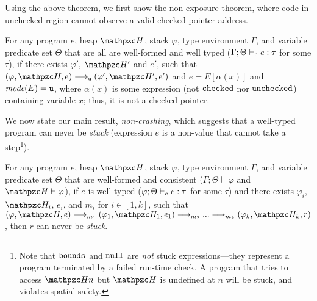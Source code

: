 Using the above theorem, we first show the non-exposure theorem,
where code in unchecked region cannot observe a valid checked pointer address.

\begin{thm}
For any \lang program $e$, heap $\heap$, stack
$\varphi$, type environment $\Gamma$, and variable predicate set $\Theta$
that are all are well-formed and well
typed ($\Gamma;\Theta\vdash_{\texttt{c}} e : \tau$ for some $\tau$), if there exists $\varphi'$,
$\heap'$ and $e'$, such that $(\varphi,\heap,e)
\longrightarrow_{\umode} (\varphi',\heap',e')$ and $e=E[\alpha(x)]$ and $\textit{mode}(E)=\texttt{u}$,
where $\alpha(x)$ is some expression (not $\mathtt{checked}$ nor $\mathtt{unchecked}$) containing variable $x$; 
thus, it is not a checked pointer.
\end{thm}

We now state our main result, {\em non-crashing},
which suggests that a well-typed program can never be \emph{stuck} (expression
$e$ is a non-value that cannot take a step\footnote{Note that
  $\mathtt{bounds}$ and $\mathtt{null}$ are \emph{not} stuck expressions---they represent a
  program terminated by a failed run-time check. A program that tries to access $\heap{n}$
  but $\heap$ is undefined at $n$ will be stuck, and violates spatial
  safety.}).


\begin{thm}\label{thm:blame} For any \lang
  program $e$, heap $\heap$, stack
$\varphi$, type environment $\Gamma$, and variable predicate set $\Theta$
that are well-formed and consistent
($\Gamma;\Theta\vdash \varphi$ and $\heap \vdash \varphi$),
if $e$ is well-typed ($\varphi;\Theta\vdash_{\texttt{c}} e :
\tau$ for some $\tau$) and there exists
$\varphi_i$, $\heap_i$, $e_i$, and $m_i$ for $i\in [1,k]$, such that
$(\varphi,\heap,e) \longrightarrow_{m_1} (\varphi_1,\heap_1,e_1)\longrightarrow_{m_2} ...\longrightarrow_{m_k} (\varphi_k,\heap_k,r)$, then $r$ can never be \emph{stuck}.
\end{thm}

